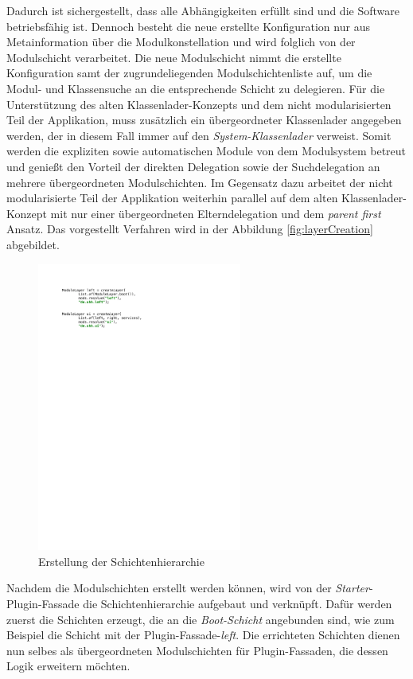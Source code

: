 	Dadurch ist sichergestellt, dass alle Abhängigkeiten erfüllt sind und die Software betriebsfähig ist. Dennoch besteht die neue erstellte Konfiguration nur aus Metainformation über die Modulkonstellation und wird folglich von der Modulschicht verarbeitet. Die neue Modulschicht nimmt die erstellte Konfiguration samt der zugrundeliegenden Modulschichtenliste auf, um die Modul- und Klassensuche an die entsprechende Schicht zu delegieren. Für die Unterstützung des alten Klassenlader-Konzepts und dem nicht modularisierten Teil der Applikation, muss zusätzlich ein übergeordneter Klassenlader angegeben werden, der in diesem Fall immer auf den \textit{System-Klassenlader} verweist. Somit werden die expliziten sowie automatischen Module von dem Modulsystem betreut und genießt den Vorteil der direkten Delegation sowie der Suchdelegation an mehrere übergeordneten Modulschichten. Im Gegensatz dazu arbeitet der nicht modularisierte Teil der Applikation weiterhin parallel auf dem alten Klassenlader-Konzept mit nur einer übergeordneten Elterndelegation und dem \textit{parent first} Ansatz. Das vorgestellt Verfahren wird in der Abbildung \ref{fig:layerCreation} abgebildet.\bigbreak
	\begin{figure}[h!]
		   \centering
		   \captionsetup{justification=centering}
		   \includegraphics[width=0.6\textwidth]{material/images/umsetzung/left.pdf}
		   \caption{Erstellung der Schichtenhierarchie}
		   \label{fig:createlayer}
	\end{figure}
	Nachdem die Modulschichten erstellt werden können, wird von der \textit{Starter}-Plugin-Fassade die Schichtenhierarchie aufgebaut und verknüpft. Dafür werden zuerst die Schichten erzeugt, die an die \textit{Boot-Schicht} angebunden sind, wie zum Beispiel die Schicht mit der Plugin-Fassade-\textit{left}. Die errichteten Schichten dienen nun selbes als übergeordneten Modulschichten für Plugin-Fassaden, die dessen Logik erweitern möchten. \newline
